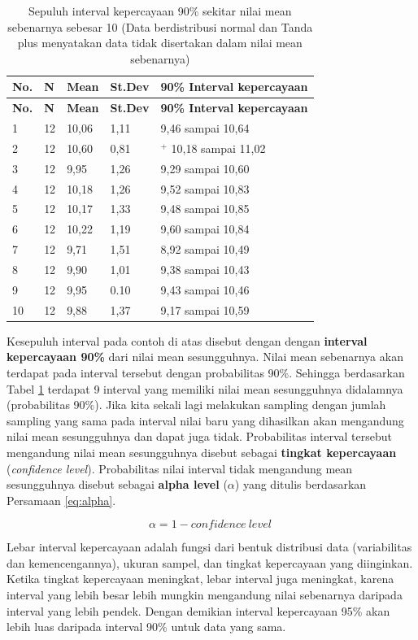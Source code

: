 \documentclass[]{book}
\begin{document}
\begin{longtable}[]{@{}lllll@{}}
\caption{\label{tab:iie} Sepuluh interval kepercayaan 90\% sekitar nilai
mean sebenarnya sebesar 10 (Data berdistribusi normal dan Tanda plus
menyatakan data tidak disertakan dalam nilai mean
sebenarnya)}\tabularnewline
\toprule
\textbf{No.} & \textbf{N} & \textbf{Mean} & \textbf{St.Dev} &
\textbf{90\% Interval kepercayaan}\tabularnewline
\midrule
\endfirsthead
\toprule
\textbf{No.} & \textbf{N} & \textbf{Mean} & \textbf{St.Dev} &
\textbf{90\% Interval kepercayaan}\tabularnewline
\midrule
\endhead
1 & 12 & 10,06 & 1,11 & 9,46 sampai 10,64\tabularnewline
2 & 12 & 10,60 & 0,81 & \(^+\) 10,18 sampai 11,02\tabularnewline
3 & 12 & 9,95 & 1,26 & 9,29 sampai 10,60\tabularnewline
4 & 12 & 10,18 & 1,26 & 9,52 sampai 10,83\tabularnewline
5 & 12 & 10,17 & 1,33 & 9,48 sampai 10,85\tabularnewline
6 & 12 & 10,22 & 1,19 & 9,60 sampai 10,84\tabularnewline
7 & 12 & 9,71 & 1,51 & 8,92 sampai 10,49\tabularnewline
8 & 12 & 9,90 & 1,01 & 9,38 sampai 10,43\tabularnewline
9 & 12 & 9,95 & 0.10 & 9,43 sampai 10,46\tabularnewline
10 & 12 & 9,88 & 1,37 & 9,17 sampai 10,59\tabularnewline
\bottomrule
\end{longtable}

Kesepuluh interval pada contoh di atas disebut dengan dengan
\textbf{interval kepercayaan 90\%} dari nilai mean sesungguhnya. Nilai
mean sebenarnya akan terdapat pada interval tersebut dengan probabilitas
90\%. Sehingga berdasarkan Tabel \ref{tab:iie} terdapat 9 interval yang
memiliki nilai mean sesungguhnya didalamnya (probabilitas 90\%). Jika
kita sekali lagi melakukan sampling dengan jumlah sampling yang sama
pada interval nilai baru yang dihasilkan akan mengandung nilai mean
sesungguhnya dan dapat juga tidak. Probabilitas interval tersebut
mengandung nilai mean sesungguhnya disebut sebagai \textbf{tingkat
kepercayaan} (\emph{confidence level}). Probabilitas nilai interval
tidak mengandung mean sesungguhnya disebut sebagai \textbf{alpha level}
(\(\alpha\)) yang ditulis berdasarkan Persamaan \eqref{eq:alpha}.

\begin{equation}
  \alpha=1-confidence\ level\ 
  \label{eq:alpha}
\end{equation}

Lebar interval kepercayaan adalah fungsi dari bentuk distribusi data
(variabilitas dan kemencengannya), ukuran sampel, dan tingkat
kepercayaan yang diinginkan. Ketika tingkat kepercayaan meningkat, lebar
interval juga meningkat, karena interval yang lebih besar lebih mungkin
mengandung nilai sebenarnya daripada interval yang lebih pendek. Dengan
demikian interval kepercayaan 95\% akan lebih luas daripada interval
90\% untuk data yang sama.
\end{document}

